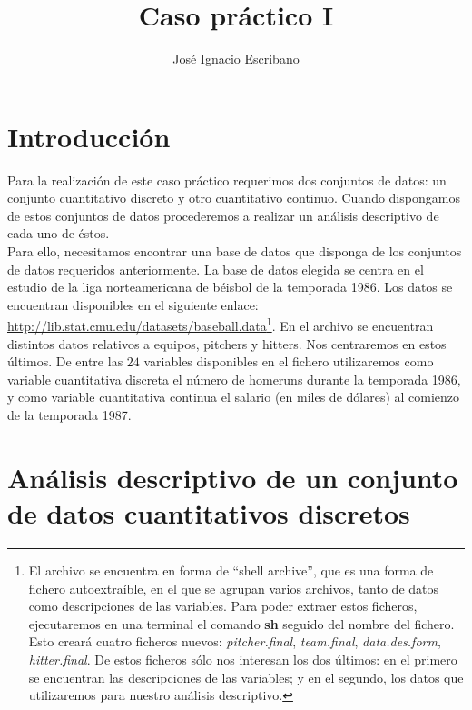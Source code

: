 \documentclass[12pt,a4paper,twoside,openright,titlepage,final]{article}
\author{José Ignacio Escribano}
\title{Caso práctico I}
\begin{document}
\setcounter{page}{1}


\listoffigures
\thispagestyle{empty}
\newpage

\tableofcontents
\thispagestyle{empty}
\newpage


\setcounter{page}{1}

\section{Introducción}

Para la realización de este caso práctico requerimos dos conjuntos de datos: un conjunto cuantitativo discreto y otro cuantitativo continuo. Cuando dispongamos de estos conjuntos de datos procederemos a realizar un análisis descriptivo de cada uno de éstos.\\

Para ello, necesitamos encontrar una base de datos que disponga de los conjuntos de datos requeridos anteriormente. La base de datos elegida se centra en el estudio de la liga norteamericana de béisbol de la temporada 1986. Los datos se encuentran disponibles en el siguiente enlace: \url{http://lib.stat.cmu.edu/datasets/baseball.data}\footnote{El archivo se encuentra en forma de ``shell archive'', que es una forma de fichero autoextraíble, en el que se agrupan varios archivos, tanto de datos como descripciones de las variables. Para poder extraer estos ficheros, ejecutaremos en una terminal el comando \textbf{sh} seguido del nombre del fichero. Esto creará cuatro ficheros nuevos: \textit{pitcher.final}, \textit{team.final}, \textit{data.des.form}, \textit{hitter.final}. De estos ficheros sólo nos interesan los dos últimos: en el primero se encuentran las descripciones de las variables; y en el segundo, los datos que utilizaremos para nuestro análisis descriptivo.}. En el archivo se encuentran distintos datos relativos a equipos, pitchers y hitters. Nos centraremos en estos últimos. De entre las $24$ variables disponibles en el fichero utilizaremos como variable cuantitativa discreta el número de homeruns durante la temporada 1986, y como variable cuantitativa continua el salario (en miles de dólares) al comienzo de la temporada 1987.  

\section{Análisis descriptivo de un conjunto de datos cuantitativos discretos}
\end{document}
